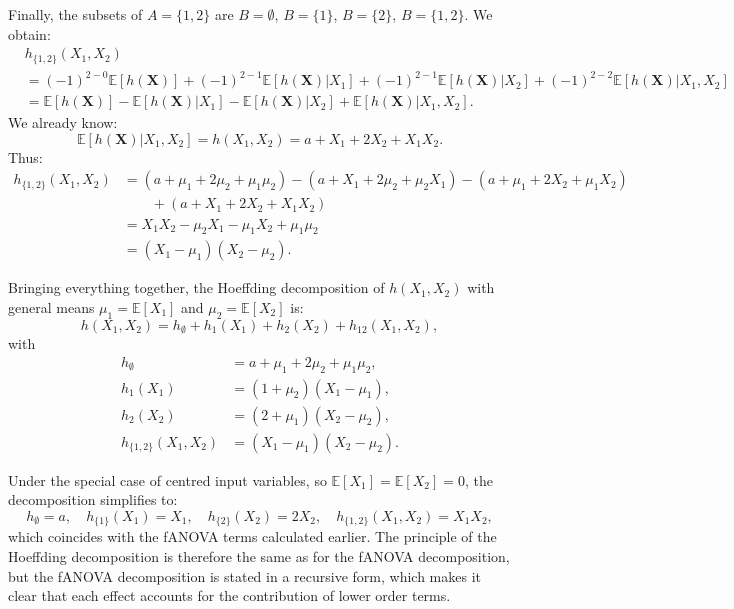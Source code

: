 Finally, the subsets of $A=\{1,2\}$ are 
$B=\emptyset$, $B=\{1\}$, $B=\{2\}$, $B=\{1,2\}$. 
We obtain:
\[
\begin{aligned}
&h_{\{1,2\}}(X_1,X_2) \\
&=
(-1)^{2-0}\mathbb{E}[h(\boldsymbol{X})]
+(-1)^{2-1}\mathbb{E}[h(\boldsymbol{X})|X_1]
+(-1)^{2-1}\mathbb{E}[h(\boldsymbol{X})|X_2]
+(-1)^{2-2}\mathbb{E}[h(\boldsymbol{X})|X_1,X_2]
\\
&=
\mathbb{E}[h(\boldsymbol{X})]
-\mathbb{E}[h(\boldsymbol{X})|X_1]
-\mathbb{E}[h(\boldsymbol{X})|X_2]
+\mathbb{E}[h(\boldsymbol{X})|X_1,X_2].
\end{aligned}
\]
We already know:
\[
\mathbb{E}[h(\boldsymbol{X})|X_1,X_2] = h(X_1,X_2) = a + X_1 + 2X_2 + X_1 X_2.
\]
Thus:
\[
\begin{aligned}
h_{\{1,2\}}(X_1,X_2)
&=(a+\mu_1+2\mu_2+\mu_1\mu_2)
 - (a+X_1+2\mu_2+\mu_2 X_1)
 - (a+\mu_1+2X_2+\mu_1 X_2) \\
&\qquad + (a+X_1+2X_2+X_1 X_2) \\
&= X_1 X_2 - \mu_2 X_1 - \mu_1 X_2 + \mu_1 \mu_2 \\
&= (X_1 - \mu_1)(X_2 - \mu_2).
\end{aligned}
\]

Bringing everything together, the Hoeffding decomposition of $h(X_1,X_2)$ with general means 
$\mu_1=\mathbb{E}[X_1]$ and $\mu_2=\mathbb{E}[X_2]$ is:
\[
h(X_1,X_2)
=
h_{\emptyset} + h_1(X_1) + h_2(X_2) + h_{12}(X_1,X_2),
\]
with
\[
\begin{aligned}
h_{\emptyset} &= a + \mu_1 + 2\mu_2 + \mu_1\mu_2, \\[0.3em]
h_1(X_1) &= (1+\mu_2)(X_1 - \mu_1), \\[0.3em]
h_2(X_2) &= (2+\mu_1)(X_2 - \mu_2), \\[0.3em]
h_{\{1,2\}}(X_1,X_2) &= (X_1 - \mu_1)(X_2 - \mu_2).
\end{aligned}
\]

Under the special case of centred input variables, so $\mathbb{E}[X_1] = \mathbb{E}[X_2] = 0$, the decomposition simplifies to:
\[
h_{\emptyset}=a,\quad
h_{\{1\}}(X_1)=X_1,\quad
h_{\{2\}}(X_2)=2X_2,\quad
h_{\{1,2\}}(X_1,X_2)=X_1 X_2,
\]
which coincides with the fANOVA terms calculated earlier. The principle of the Hoeffding decomposition is therefore the same as for the fANOVA decomposition, but the fANOVA decomposition is stated in a recursive form, which makes it clear that each effect accounts for the contribution of lower order terms.



